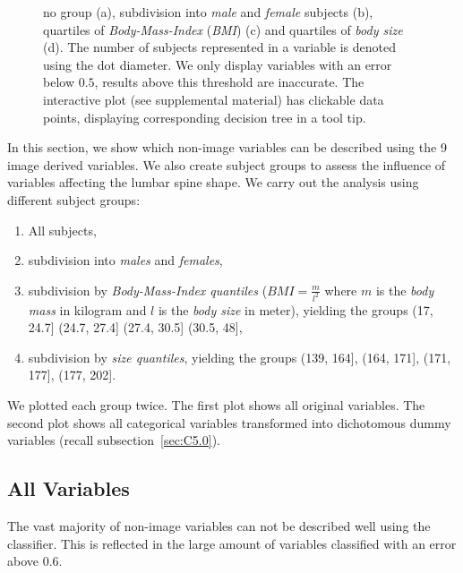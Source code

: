 \documentclass[a4paper,twoside]{style/article}
\begin{document}
\begin{figure}[p!]
{no group (a), subdivision into \emph{male} and \emph{female} subjects (b), quartiles of \emph{Body-Mass-Index} (\emph{BMI}) (c) and quartiles of \emph{body size} (d).
The number of subjects represented in a variable is denoted using the dot diameter.
We only display variables with an error below $0.5$, results above this threshold are inaccurate.
The interactive plot (see supplemental material) has clickable data points, displaying corresponding decision tree in a tool tip.
}
  \label{fig:results}
\end{figure}
\noindent In this section, we show which non-image variables can be described using the 9 image derived variables.
We also create subject groups to assess the influence of variables affecting the lumbar spine shape.
We carry out the analysis using different subject groups:
\begin{enumerate}
	\item All subjects,
	\item subdivision into \emph{males} and \emph{females},
	\item subdivision by \emph{Body-Mass-Index quantiles} ($BMI = \frac{m}{l^2}$ where $m$ is the \emph{body mass} in kilogram and $l$ is the \emph{body size} in meter), yielding the groups (17, 24.7] (24.7, 27.4] (27.4, 30.5] (30.5, 48],
	\item subdivision by \emph{size quantiles}, yielding the groups (139, 164], (164, 171], (171, 177], (177, 202].
\end{enumerate}
We plotted each group twice.
The first plot shows all original variables.
The second plot shows all categorical variables transformed into dichotomous dummy variables (recall subsection~\ref{sec:C5.0}).

\subsection{All Variables}
The vast majority of non-image variables can not be described well using the classifier.
This is reflected in the large amount of variables classified with an error above $0.6$.
\end{document}
